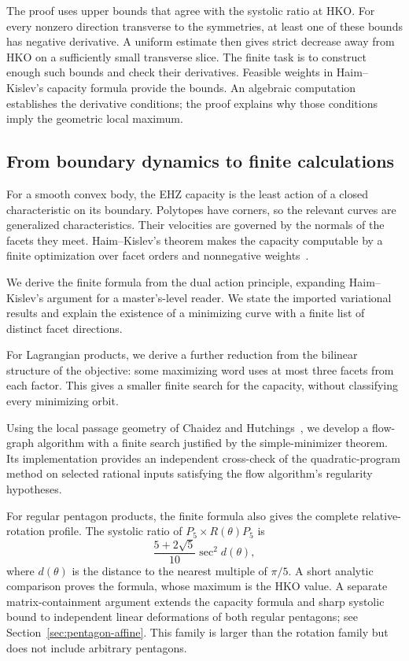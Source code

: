 The proof uses upper bounds that agree with the systolic ratio at HKO.
For every nonzero direction transverse to the symmetries, at least one of
these bounds has negative derivative. A uniform estimate then gives strict
decrease away from HKO on a sufficiently small transverse slice.
The finite task is to construct enough
such bounds and check their derivatives. Feasible weights in Haim--Kislev's
capacity formula provide the bounds. An algebraic computation establishes the derivative
conditions; the proof explains why those conditions imply the geometric
local maximum.

\subsection{From boundary dynamics to finite calculations}

For a smooth convex body, the EHZ capacity is the least action of a closed
characteristic on its boundary. Polytopes have corners, so the relevant
curves are generalized characteristics. Their velocities are governed by
the normals of the facets they meet. Haim--Kislev's theorem makes the
capacity computable by a finite optimization over facet orders and
nonnegative weights~\cite{HK2017}.

We derive the finite formula from the dual action principle, expanding
Haim--Kislev's argument for a master's-level reader. We state the imported
variational results and explain the existence of a minimizing curve with a
finite list of distinct facet directions.

For Lagrangian products, we derive a further reduction from the bilinear
structure of the objective: some maximizing word uses at most three facets
from each factor. This gives a smaller finite search for the capacity,
without classifying every minimizing orbit.

Using the local passage geometry of Chaidez and Hutchings~\cite{CH2021},
we develop a flow-graph algorithm with a finite search justified by the
simple-minimizer theorem. Its implementation provides an independent
cross-check of the quadratic-program method on selected rational inputs
satisfying the flow algorithm's regularity hypotheses.

For regular pentagon products, the finite formula also gives the complete
relative-rotation profile. The systolic ratio of
$P_5\times R(\theta)P_5$ is
\[
 \frac{5+2\sqrt5}{10}\sec^2 d(\theta),
\]
where $d(\theta)$ is the distance to the nearest multiple of $\pi/5$.
A short analytic comparison proves the formula, whose maximum is the HKO
value. A separate matrix-containment argument extends the capacity formula
and sharp systolic bound to independent linear deformations of both regular
pentagons; see Section~\ref{sec:pentagon-affine}. This family is larger
than the rotation family but does not include arbitrary pentagons.

